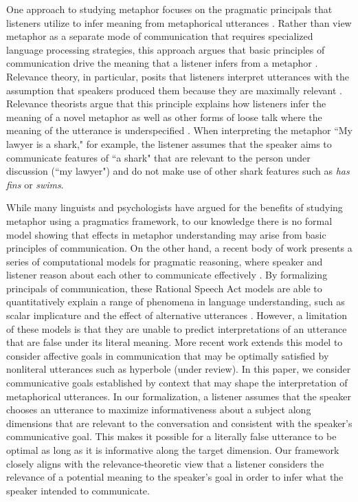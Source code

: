 \documentclass[10pt,letterpaper]{article}
\begin{document}
One approach to studying metaphor focuses on the pragmatic principals that listeners utilize to infer meaning from metaphorical utterances \cite{tendahl2008complementary}. Rather than view metaphor as a separate mode of communication that requires specialized language processing strategies, this approach argues that basic principles of communication drive the meaning that a listener infers from a metaphor \cite{sperber2008deflationary, wilson2006metaphor}. Relevance theory, in particular, posits that listeners interpret utterances with the assumption that speakers produced them because they are maximally relevant \cite{wilson2002relevance}. Relevance theorists argue that this principle explains how listeners infer the meaning of a novel metaphor as well as other forms of loose talk where the meaning of the utterance is underspecified  \cite{sperber1985loose}. When interpreting the metaphor ``My lawyer is a shark," for example, the listener assumes that the speaker aims to communicate features of  ``a shark" that are relevant to the person under discussion (``my lawyer") and do not make use of other shark features such as \emph{has fins} or \emph{swims}.

While many linguists and psychologists have argued for the benefits of studying metaphor using a pragmatics framework, to our knowledge there is no formal model showing that effects in metaphor understanding may arise from basic principles of communication. On the other hand, a recent body of work presents a series of computational models for pragmatic reasoning, where speaker and listener reason about each other to communicate effectively \cite{frank2012predicting, jager2009pragmatic}. By formalizing principals of communication, these Rational Speech Act models are able to quantitatively explain a range of phenomena in language understanding, such as scalar implicature and the effect of alternative utterances \cite{goodman2013knowledge, bergen2012s}. However, a limitation of these models is that they are unable to predict interpretations of an utterance that are false under its literal meaning. More recent work extends this model to consider affective goals in communication that may be optimally satisfied by nonliteral utterances such as hyperbole (under review). In this paper, we consider communicative goals established by context that may shape the interpretation of metaphorical utterances. In our formalization, a listener assumes that the speaker chooses an utterance to maximize informativeness about a subject along dimensions that are relevant to the conversation and consistent with the speaker's communicative goal. This makes it possible for a literally false utterance to be optimal as long as it is informative along the target dimension. Our framework closely aligns with the relevance-theoretic view that a listener considers the relevance of a potential meaning to the speaker's goal in order to infer what the speaker intended to communicate. 
\end{document}
